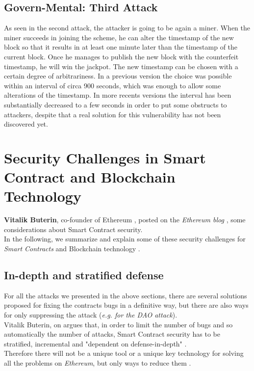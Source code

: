 \subsection{Govern-Mental: Third Attack}
As seen in the second attack, the attacker is going to be again a miner. When the miner succeeds in joining the scheme, he can alter the timestamp of the new block so that it results in at least one minute later than the timestamp of the current block. Once he manages to publish the new block with the counterfeit timestamp, he will win the jackpot.
The new timestamp can be chosen with a certain degree of arbitrariness\cite{paper2}. In a previous version the choice was possible within an interval of circa 900 seconds\cite{BlockProtocol}, which was enough to allow some alterations of the timestamp. In more recents versions the interval has been substantially decreased to a few seconds\cite{paper2} in order to put some obstructs to attackers, despite that a real solution for this vulnerability has not been discovered yet.
\section{Security Challenges in Smart Contract and Blockchain Technology}
\textbf{Vitalik Buterin}, co-founder of Ethereum \cite{vitalin}, posted on the \textit{Ethereum blog} \cite{challenge2}, some considerations about Smart Contract security.\\
In the following, we summarize and explain some of these security challenges for  \textit{Smart Contracts} and Blockchain technology \cite{challenge1}.
\subsection{In-depth and stratified defense}
For all the attacks we presented in the above sections, there are several solutions proposed for fixing the contracts bugs in a definitive way, but there are also ways for only suppressing the attack (\textit{e.g. for the DAO attack}). \\
Vitalik Buterin, on \cite{challenge2} argues that, in order to limit the number of bugs and so automatically the number of attacks, Smart Contract security has to be stratified, incremental and "dependent on defense-in-depth" \cite{challenge2}. \\
Therefore there will not be a unique tool or a unique key technology for solving all the problems on \textit{Ethereum}, but only ways to reduce them \cite{challenge2}.
